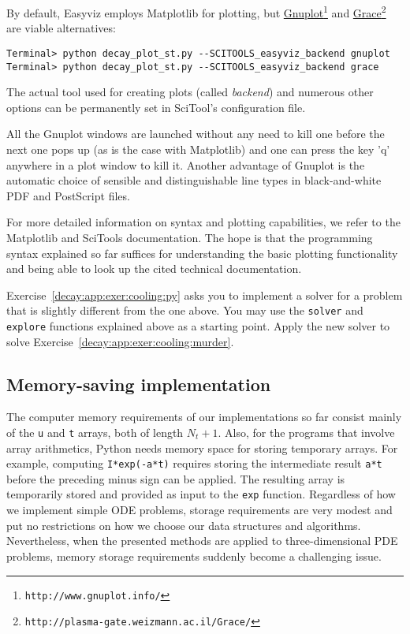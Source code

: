 \documentclass[graybox,sectrefs,envcountresetchap,open=right,final]{svmonodo}
\newenvironment{question_mdfboxadmon}[1][]{
\begin{question_mdfboxmdframed}[frametitle=#1]
}
{
\end{question_mdfboxmdframed}
}
\begin{document}
By default, Easyviz employs Matplotlib for plotting, but \href{{http://www.gnuplot.info/}}{Gnuplot}\footnote{\texttt{http://www.gnuplot.info/}} and \href{{http://plasma-gate.weizmann.ac.il/Grace/}}{Grace}\footnote{\texttt{http://plasma-gate.weizmann.ac.il/Grace/}} are viable alternatives:

\begin{Verbatim}[frame=lines,label=\fbox{{\tiny Terminal}},framesep=2.5mm,framerule=0.7pt,fontsize=\fontsize{9pt}{9pt}]
Terminal> python decay_plot_st.py --SCITOOLS_easyviz_backend gnuplot
Terminal> python decay_plot_st.py --SCITOOLS_easyviz_backend grace
\end{Verbatim}
The actual tool used for creating plots (called \emph{backend})
and numerous other options
can be permanently set in SciTool's configuration file.

All the Gnuplot windows are launched without any need to kill one before
the next one pops up (as is the case with Matplotlib) and one can
press the key 'q' anywhere in a plot window to kill it.
Another advantage of Gnuplot is the automatic choice of sensible
and distinguishable line types in black-and-white PDF and PostScript
files.

For more detailed information on syntax and plotting capabilities,
we refer to the Matplotlib \cite{Matplotlib:doc}
and SciTools \cite{SciTools:doc} documentation.
The hope is that
the programming syntax explained so far suffices for understanding the
basic plotting functionality and being able to look up
the cited technical documentation.


\begin{question_mdfboxadmon}
Exercise~\ref{decay:app:exer:cooling:py} asks you to implement
a solver for a problem that is slightly different from the
one above. You may use the \texttt{solver} and \texttt{explore} functions
explained above as a starting point. Apply the new solver
to solve Exercise~\ref{decay:app:exer:cooling:murder}.
\end{question_mdfboxadmon}





\subsection{Memory-saving implementation}

The computer memory requirements of our implementations so far consist
mainly of the \texttt{u} and \texttt{t} arrays, both of length $N_t+1$.  Also, for
the programs that involve array arithmetics, Python needs memory space
for storing temporary arrays. For example, computing \texttt{I*exp(-a*t)}
requires storing the intermediate result \texttt{a*t} before the preceding
minus sign can be applied. The resulting array is temporarily stored
and provided as input to the \texttt{exp} function.  Regardless of how we
implement simple ODE problems, storage requirements are very modest
and put no restrictions on how we choose our data structures and
algorithms.  Nevertheless, when the presented methods are applied to
three-dimensional PDE problems, memory storage requirements suddenly
become a challenging issue.
\end{document}
